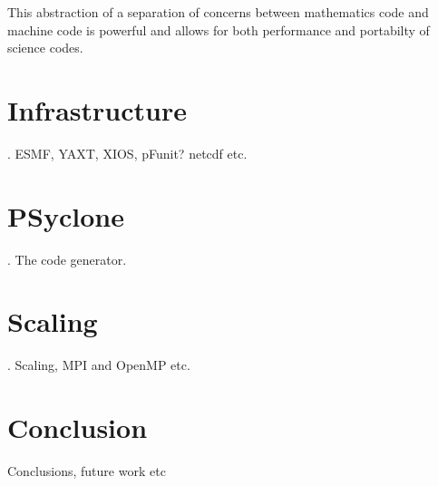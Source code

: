 \documentclass[times]{elsarticle}
\begin{document}
This abstraction of a separation of concerns between mathematics code
and machine code is powerful and allows for both performance and
portabilty of science codes.

\section{\label{sec:lib}Infrastructure}.
ESMF, YAXT, XIOS, pFunit? netcdf etc.

\section{\label{sec:Psyclone}PSyclone}.
The code generator.

\section{\label{sec:scal}Scaling}.
Scaling, MPI and OpenMP etc.

\section{Conclusion}
\label{sec:con}
Conclusions, future work etc



\end{document}
